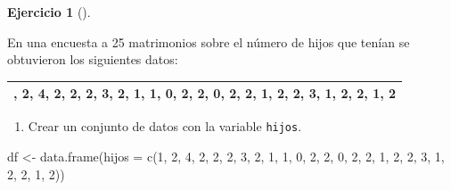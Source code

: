 \documentclass[
  a4paper,
]{scrreport}
\newenvironment{Shaded}{\begin{snugshade}}{\end{snugshade}}
\newcommand{\AttributeTok}[1]{\textcolor[rgb]{0.40,0.45,0.13}{#1}}
\newcommand{\DecValTok}[1]{\textcolor[rgb]{0.68,0.00,0.00}{#1}}
\newcommand{\FunctionTok}[1]{\textcolor[rgb]{0.28,0.35,0.67}{#1}}
\newcommand{\NormalTok}[1]{\textcolor[rgb]{0.00,0.23,0.31}{#1}}
\newcommand{\OtherTok}[1]{\textcolor[rgb]{0.00,0.23,0.31}{#1}}
\providecommand{\tightlist}{%
  \setlength{\itemsep}{0pt}\setlength{\parskip}{0pt}}\usepackage{longtable,booktabs,array}
\theoremstyle{definition}
\newtheorem{exercise}{Ejercicio}[chapter]
\theoremstyle{remark}
\begin{document}
\leavevmode{}%
\begin{exercise}[]\label{exr-1}

En una encuesta a 25 matrimonios sobre el número de hijos que tenían se
obtuvieron los siguientes datos:

\begin{longtable}[]{@{}
  >{\centering\arraybackslash}p{}@{}}
\toprule()
\endhead
1, 2, 4, 2, 2, 2, 3, 2, 1, 1, 0, 2, 2, 0, 2, 2, 1, 2, 2, 3, 1, 2, 2, 1,
2 \\
\bottomrule()
\end{longtable}

\begin{enumerate}
\def\labelenumi{\alph{enumi}.}
\tightlist
\item
  Crear un conjunto de datos con la variable \texttt{hijos}.
\end{enumerate}

\begin{tcolorbox}[enhanced jigsaw, rightrule=.15mm, toptitle=1mm, colbacktitle=quarto-callout-tip-color!10!white, titlerule=0mm, colback=white, leftrule=.75mm, bottomtitle=1mm, colframe=quarto-callout-tip-color-frame, breakable, title=\textcolor{quarto-callout-tip-color}{\faLightbulb}\hspace{0.5em}{Solución}, arc=.35mm, coltitle=black, opacityback=0, bottomrule=.15mm, opacitybacktitle=0.6, left=2mm, toprule=.15mm]

\begin{Shaded}
\begin{Highlighting}[]
\NormalTok{df }\OtherTok{\textless{}{-}} \FunctionTok{data.frame}\NormalTok{(}\AttributeTok{hijos =} \FunctionTok{c}\NormalTok{(}\DecValTok{1}\NormalTok{, }\DecValTok{2}\NormalTok{, }\DecValTok{4}\NormalTok{, }\DecValTok{2}\NormalTok{, }\DecValTok{2}\NormalTok{, }\DecValTok{2}\NormalTok{, }\DecValTok{3}\NormalTok{, }\DecValTok{2}\NormalTok{, }\DecValTok{1}\NormalTok{, }\DecValTok{1}\NormalTok{, }\DecValTok{0}\NormalTok{, }\DecValTok{2}\NormalTok{, }\DecValTok{2}\NormalTok{, }\DecValTok{0}\NormalTok{, }\DecValTok{2}\NormalTok{, }\DecValTok{2}\NormalTok{, }\DecValTok{1}\NormalTok{, }\DecValTok{2}\NormalTok{, }\DecValTok{2}\NormalTok{, }\DecValTok{3}\NormalTok{, }\DecValTok{1}\NormalTok{, }\DecValTok{2}\NormalTok{, }\DecValTok{2}\NormalTok{, }\DecValTok{1}\NormalTok{, }\DecValTok{2}\NormalTok{))}
\end{Highlighting}
\end{Shaded}


\end{tcolorbox}
\end{exercise}
\end{document}
